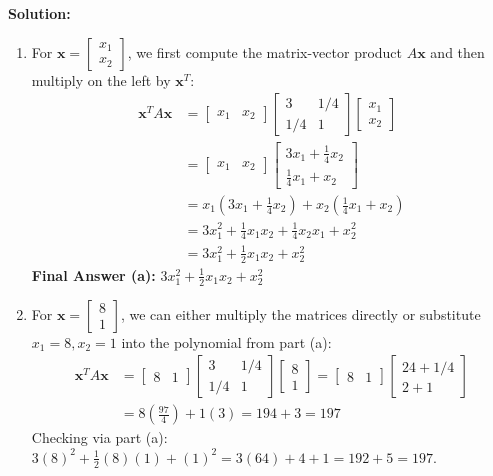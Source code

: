 \documentclass[11pt, letterpaper]{article}
\theoremstyle{definition}
\theoremstyle{remark}
\begin{document}
\textbf{Solution:}
\begin{enumerate}[label=\alph*.]
    \item For $\mathbf{x} = \begin{bmatrix} x_1 \\ x_2 \end{bmatrix}$, we first compute the matrix-vector product $A\mathbf{x}$ and then multiply on the left by $\mathbf{x}^T$:
    \begin{align*}
        \mathbf{x}^T A \mathbf{x} &= \begin{bmatrix} x_1 & x_2 \end{bmatrix} \begin{bmatrix} 3 & 1/4 \\ 1/4 & 1 \end{bmatrix} \begin{bmatrix} x_1 \\ x_2 \end{bmatrix} \\
        &= \begin{bmatrix} x_1 & x_2 \end{bmatrix} \begin{bmatrix} 3x_1 + \frac{1}{4}x_2 \\[4pt] \frac{1}{4}x_1 + x_2 \end{bmatrix} \\
        &= x_1\left(3x_1 + \frac{1}{4}x_2\right) + x_2\left(\frac{1}{4}x_1 + x_2\right) \\
        &= 3x_1^2 + \frac{1}{4}x_1x_2 + \frac{1}{4}x_2x_1 + x_2^2 \\
        &= 3x_1^2 + \frac{1}{2}x_1x_2 + x_2^2
    \end{align*}
    \textbf{Final Answer (a):} $3x_1^2 + \frac{1}{2}x_1x_2 + x_2^2$

    \item For $\mathbf{x} = \begin{bmatrix} 8 \\ 1 \end{bmatrix}$, we can either multiply the matrices directly or substitute $x_1 = 8, x_2 = 1$ into the polynomial from part (a):
    \begin{align*}
        \mathbf{x}^T A \mathbf{x} &= \begin{bmatrix} 8 & 1 \end{bmatrix} \begin{bmatrix} 3 & 1/4 \\ 1/4 & 1 \end{bmatrix} \begin{bmatrix} 8 \\ 1 \end{bmatrix} = \begin{bmatrix} 8 & 1 \end{bmatrix} \begin{bmatrix} 24 + 1/4 \\ 2 + 1 \end{bmatrix} \\
        &= 8\left(\frac{97}{4}\right) + 1(3) = 194 + 3 = 197
    \end{align*}
    Checking via part (a): $3(8)^2 + \frac{1}{2}(8)(1) + (1)^2 = 3(64) + 4 + 1 = 192 + 5 = 197$.
    

\end{enumerate}
\end{document}
